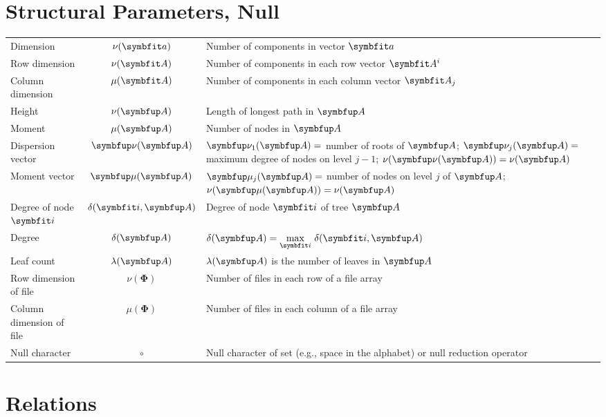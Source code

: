 \section{Structural Parameters, Null}
\begin{tabularx}{\textwidth}{ l c X }
	Dimension
		& \( \nu(\vect{a}) \)
		& Number of components in vector \( \vect{a} \)
		\\
	Row dimension
		& \( \nu(\mat{A}) \)
		& Number of components in each row vector \( \mat{A}^i \)
		\\
	Column dimension
		& \( \mu(\mat{A}) \)
		& Number of components in each column vector \( \mat{A}_j \)
		\\
	Height
		& \( \nu(\tree{A}) \)
		& Length of longest path in \( \tree{A} \)
		\\
	Moment
		& \( \mu(\tree{A}) \)
		& Number of nodes in \( \tree{A} \)
		\\
	Dispersion vector
		& \( \bfnu(\tree{A}) \)
		& \( \bfnu_1(\tree{A}) = \) number of roots of \( \tree{A} \); \( \bfnu_j(\tree{A}) = \) maximum degree of nodes on level \( j − 1 \); \( \nu(\bfnu(\tree{A})) = \nu(\tree{A}) \)
		\\
	Moment vector
		& \( \bfmu(\tree{A}) \)
		& \( \bfmu_j(\tree{A}) = \) number of nodes on level \( j \) of \( \tree{A} \); \( \nu(\bfmu(\tree{A})) = \nu(\tree{A}) \)
		\\
	Degree of node \( \vect{i} \)
		& \( \delta(\vect{i}, \tree{A}) \)
		& Degree of node \( \vect{i} \) of tree \( \tree{A} \)
		\\
	Degree
		& \( \delta(\tree{A}) \)
		& \( \delta(\tree{A}) = \underset{\vect{i}}{\max}\ \delta(\vect{i},\tree{A}) \)
		\\
	Leaf count
		& \( \lambda(\tree{A}) \)
		& \( \lambda(\tree{A}) \) is the number of leaves in \( \tree{A} \)
		\\
	Row dimension of file
		& \( \nu(\mathbf{Φ}) \)
		& Number of files in each row of a file array
		\\
	Column dimension of file
		& \( \mu(\mathbf{Φ}) \)
		& Number of files in each column of a file array
		\\
	Null character
		& \( ∘ \)
		& Null character of set (e.g., space in the alphabet) or null reduction operator
		\\
\end{tabularx}

\section{Relations}



